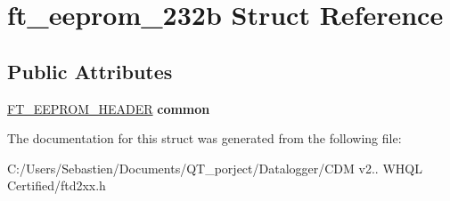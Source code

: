 \hypertarget{structft__eeprom__232b}{}\section{ft\+\_\+eeprom\+\_\+232b Struct Reference}
\label{structft__eeprom__232b}
\subsection*{Public Attributes}
\begin{DoxyCompactItemize}
\item 
\mbox{\label{structft__eeprom__232b_ad20111a2bbd898f3e5e8e0f780e8d7cf}} 
\hyperlink{structft__eeprom__header}{F\+T\+\_\+\+E\+E\+P\+R\+O\+M\+\_\+\+H\+E\+A\+D\+ER} {\bfseries common}
\end{DoxyCompactItemize}


The documentation for this struct was generated from the following file\+:\begin{DoxyCompactItemize}
\item 
C\+:/\+Users/\+Sebastien/\+Documents/\+Q\+T\+\_\+porject/\+Datalogger/\+C\+D\+M v2.. W\+H\+Q\+L Certified/ftd2xx.\+h\end{DoxyCompactItemize}

